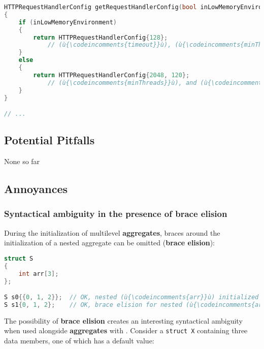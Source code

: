 \begin{lstlisting}[language=C++]
HTTPRequestHandlerConfig getRequestHandlerConfig(bool inLowMemoryEnvironment)
{
    if (inLowMemoryEnvironment)
    {
        return HTTPRequestHandlerConfig{128};
            // (ù{\codeincomments{timeout}}ù), (ù{\codeincomments{minThreads}}ù), and (ù{\codeincomments{maxThreads}}ù) have their default value.
    }
    else
    {
        return HTTPRequestHandlerConfig{2048, 120};
            // (ù{\codeincomments{minThreads}}ù), and (ù{\codeincomments{maxThreads}}ù) have their default value.
    }
}

// ...
\end{lstlisting}
    

\subsection[Potential Pitfalls]{Potential Pitfalls}\label{potential-pitfalls}

None so far

\subsection[Annoyances]{Annoyances}\label{annoyances}

\subsubsection[Syntactical ambiguity in the presence of \textbf{brace elision}]{Syntactical ambiguity in the presence of \textbf{brace elision}}\label{syntactical-ambiguity-in-the-presence-of-brace-elision}

During the initialization of multilevel \textbf{aggregates}, braces
around the initialization of a nested aggregate can be omitted
(\textbf{brace elision}):

\begin{lstlisting}[language=C++]
struct S
{
    int arr[3];
};

S s0{{0, 1, 2}};  // OK, nested (ù{\codeincomments{arr}}ù) initialized explicitly
S s1{0, 1, 2};    // OK, brace elision for nested (ù{\codeincomments{arr}}ù)
\end{lstlisting}
    
\noindent The possibility of \textbf{brace elision} creates an interesting
syntactical ambiguity when used alongside \textbf{aggregates} with
. Consider a
\texttt{struct}~\texttt{X} containing three data members, one of which
has a default value:

